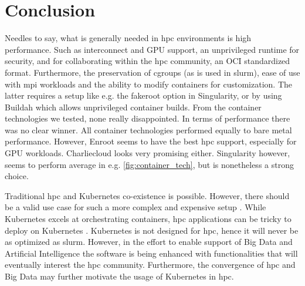 \documentclass[conference]{IEEEtran}
\begin{document}
\section{Conclusion}
Needles to say, what is generally needed in \gls{hpc} environments is high performance. Such as interconnect and GPU support, an unprivileged runtime for security, and for collaborating within the \gls{hpc} community, an OCI standardized format. Furthermore, the preservation of cgroups (as is used in \gls{slurm}), ease of use with \gls{mpi} workloads and the ability to modify containers for customization. The latter requires a setup like e.g. the fakeroot option in Singularity, or by using Buildah which allows unprivileged container builds. From the container technologies we tested, none really disappointed. In terms of performance there was no clear winner. All container technologies performed equally to bare metal performance. However, Enroot seems to have the best \gls{hpc} support, especially for GPU workloads. Charliecloud looks very promising either. Singularity however, seems to perform average in e.g. \ref{fig:container_tech}, but is nonetheless a strong choice. 

Traditional \gls{hpc} and Kubernetes co-existence is possible. However, there should be a valid use case for such a more complex and expensive setup \cite{cloudy-hutch}. While Kubernetes excels at orchestrating containers, \gls{hpc} applications can be tricky to deploy on Kubernetes \cite{kubenetes-blog-meets-hpc}. Kubernetes is not designed for \gls{hpc}, hence it will never be as optimized as \gls{slurm}. However, in the effort to enable support of Big Data and Artificial Intelligence the software is being enhanced with functionalities that will eventually interest the \gls{hpc} community. Furthermore, the convergence of \gls{hpc} and Big Data may further motivate the usage of Kubernetes in \gls{hpc}.





\end{document}
